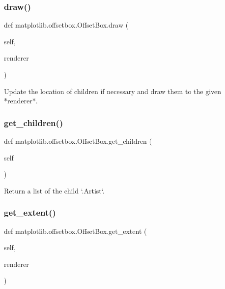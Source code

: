 \subsubsection{\texorpdfstring{draw()}{draw()}}
{\footnotesize\ttfamily def matplotlib.\+offsetbox.\+Offset\+Box.\+draw (\begin{DoxyParamCaption}\item[{}]{self,  }\item[{}]{renderer }\end{DoxyParamCaption})}

\begin{DoxyVerb}Update the location of children if necessary and draw them
to the given *renderer*.
\end{DoxyVerb}
 \mbox{\label{classmatplotlib_1_1offsetbox_1_1OffsetBox_a1534ae6ea6af5fec69f04e003e89704b}} 
\subsubsection{\texorpdfstring{get\+\_\+children()}{get\_children()}}
{\footnotesize\ttfamily def matplotlib.\+offsetbox.\+Offset\+Box.\+get\+\_\+children (\begin{DoxyParamCaption}\item[{}]{self }\end{DoxyParamCaption})}

\begin{DoxyVerb}Return a list of the child `.Artist`\s.\end{DoxyVerb}
 \mbox{\label{classmatplotlib_1_1offsetbox_1_1OffsetBox_afbba594fd2219eb5d77be439de38c1eb}} 
\subsubsection{\texorpdfstring{get\+\_\+extent()}{get\_extent()}}
{\footnotesize\ttfamily def matplotlib.\+offsetbox.\+Offset\+Box.\+get\+\_\+extent (\begin{DoxyParamCaption}\item[{}]{self,  }\item[{}]{renderer }\end{DoxyParamCaption})}

